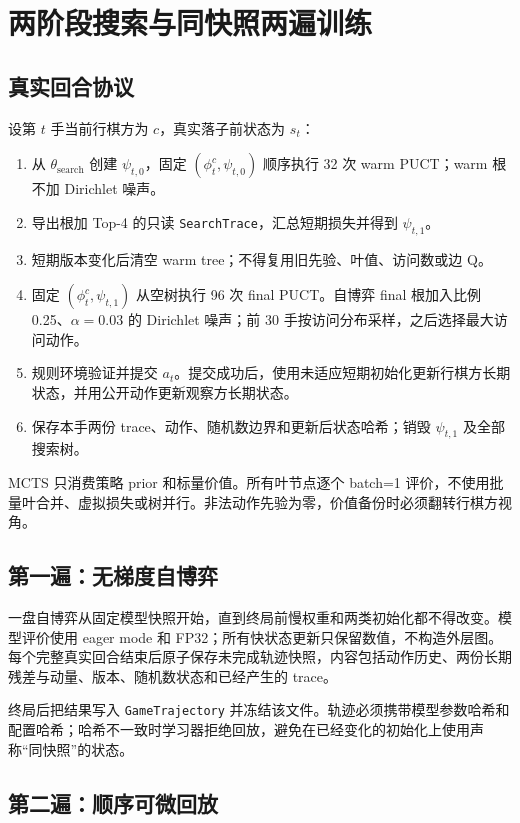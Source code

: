 \documentclass[UTF8,11pt,a4paper]{ctexart}
\newcommand{\searchinit}{\theta_{\mathrm{search}}}
\newcommand{\code}[1]{\texttt{#1}}
\begin{document}
\section{两阶段搜索与同快照两遍训练}

\subsection{真实回合协议}

设第 $t$ 手当前行棋方为 $c$，真实落子前状态为 $s_t$：

\begin{enumerate}
  \item 从 $\searchinit$ 创建 $\psi_{t,0}$，固定 $(\phi_t^c,\psi_{t,0})$ 顺序执行 32 次 warm PUCT；warm 根不加 Dirichlet 噪声。
  \item 导出根加 Top-4 的只读 \code{SearchTrace}，汇总短期损失并得到 $\psi_{t,1}$。
  \item 短期版本变化后清空 warm tree；不得复用旧先验、叶值、访问数或边 Q。
  \item 固定 $(\phi_t^c,\psi_{t,1})$ 从空树执行 96 次 final PUCT。自博弈 final 根加入比例 0.25、$\alpha=0.03$ 的 Dirichlet 噪声；前 30 手按访问分布采样，之后选择最大访问动作。
  \item 规则环境验证并提交 $a_t$。提交成功后，使用未适应短期初始化更新行棋方长期状态，并用公开动作更新观察方长期状态。
  \item 保存本手两份 trace、动作、随机数边界和更新后状态哈希；销毁 $\psi_{t,1}$ 及全部搜索树。
\end{enumerate}

MCTS 只消费策略 prior 和标量价值。所有叶节点逐个 batch=1 评价，不使用批量叶合并、虚拟损失或树并行。非法动作先验为零，价值备份时必须翻转行棋方视角。

\subsection{第一遍：无梯度自博弈}

一盘自博弈从固定模型快照开始，直到终局前慢权重和两类初始化都不得改变。模型评价使用 eager mode 和 FP32；所有快状态更新只保留数值，不构造外层图。每个完整真实回合结束后原子保存未完成轨迹快照，内容包括动作历史、两份长期残差与动量、版本、随机数状态和已经产生的 trace。

终局后把结果写入 \code{GameTrajectory} 并冻结该文件。轨迹必须携带模型参数哈希和配置哈希；哈希不一致时学习器拒绝回放，避免在已经变化的初始化上使用声称“同快照”的状态。

\subsection{第二遍：顺序可微回放}
\end{document}
